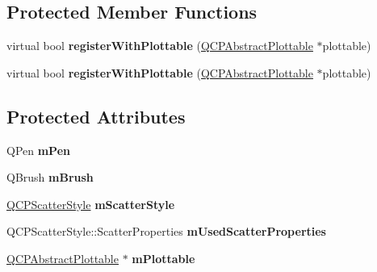 \subsection*{Protected Member Functions}
\begin{DoxyCompactItemize}
\item 
\mbox{\label{class_q_c_p_selection_decorator_af66cb39e308da0285ae5d533e1e85027}} 
virtual bool {\bfseries register\+With\+Plottable} (\hyperlink{class_q_c_p_abstract_plottable}{Q\+C\+P\+Abstract\+Plottable} $\ast$plottable)
\item 
\mbox{\label{class_q_c_p_selection_decorator_a13dd7ec86c3159eea76c2eb293b99213}} 
virtual bool {\bfseries register\+With\+Plottable} (\hyperlink{class_q_c_p_abstract_plottable}{Q\+C\+P\+Abstract\+Plottable} $\ast$plottable)
\end{DoxyCompactItemize}
\subsection*{Protected Attributes}
\begin{DoxyCompactItemize}
\item 
\mbox{\label{class_q_c_p_selection_decorator_a684a691c146a5bac927c0146bd28d557}} 
Q\+Pen {\bfseries m\+Pen}
\item 
\mbox{\label{class_q_c_p_selection_decorator_a4e3a3a01fdec5b018c0c59a0b6ae9f70}} 
Q\+Brush {\bfseries m\+Brush}
\item 
\mbox{\label{class_q_c_p_selection_decorator_a5b822197a1bf802c5cf8c3dc43ca549a}} 
\hyperlink{class_q_c_p_scatter_style}{Q\+C\+P\+Scatter\+Style} {\bfseries m\+Scatter\+Style}
\item 
\mbox{\label{class_q_c_p_selection_decorator_acb4f6af085283c9ce7d5c168fb53e855}} 
Q\+C\+P\+Scatter\+Style\+::\+Scatter\+Properties {\bfseries m\+Used\+Scatter\+Properties}
\item 
\mbox{\label{class_q_c_p_selection_decorator_a44fb66e2198569c035f67104a74388ca}} 
\hyperlink{class_q_c_p_abstract_plottable}{Q\+C\+P\+Abstract\+Plottable} $\ast$ {\bfseries m\+Plottable}
\end{DoxyCompactItemize}
